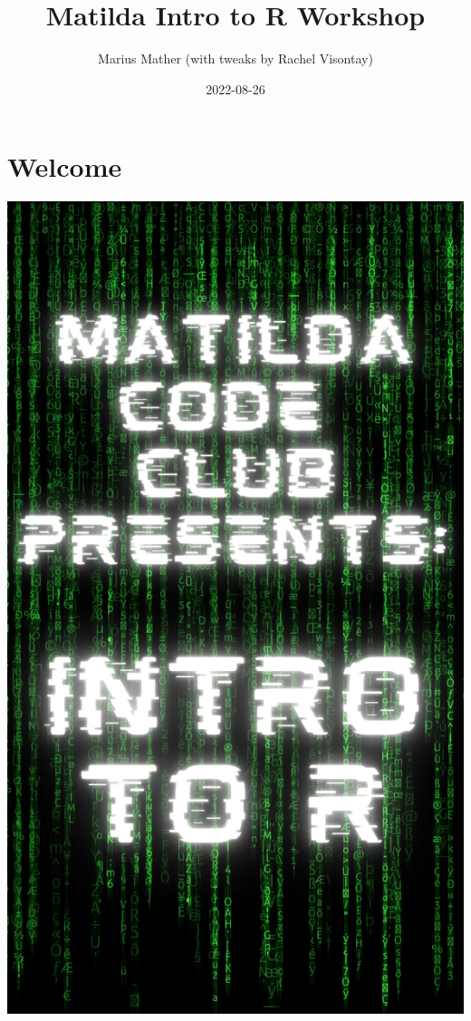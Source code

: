 \documentclass[
]{book}
\title{Matilda Intro to R Workshop}
\author{Marius Mather (with tweaks by Rachel Visontay)}
\date{2022-08-26}
\begin{document}
\maketitle

\setlength{\abovedisplayskip}{-5pt}
\setlength{\abovedisplayshortskip}{-5pt}

{
\hypersetup{linkcolor=}
\setcounter{tocdepth}{1}
\tableofcontents
}
\hypertarget{welcome}{%
\chapter*{Welcome}\label{welcome}}

\includegraphics{Images/Green Modern Matrix Code Coming Soon Instagram Story (2).png}
\end{document}
